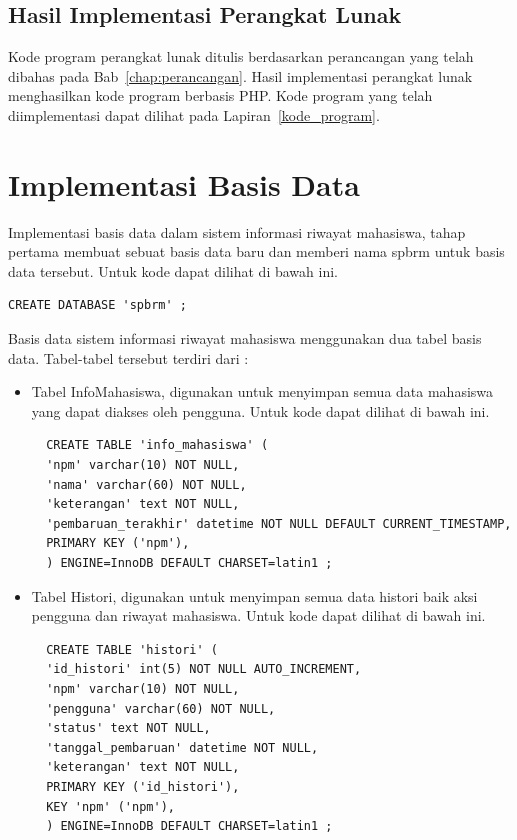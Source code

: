 \subsection{Hasil Implementasi Perangkat Lunak}
\label{sec:hasilimplementasi}

Kode program perangkat lunak ditulis berdasarkan perancangan yang telah dibahas pada Bab~\ref{chap:perancangan}. Hasil implementasi perangkat lunak menghasilkan kode program berbasis PHP. Kode program yang telah diimplementasi dapat dilihat pada Lapiran~\ref{kode_program}.

\section{Implementasi Basis Data}
\label{sec:implementasibasisdata}

Implementasi basis data dalam sistem informasi riwayat mahasiswa, tahap pertama membuat sebuat basis data baru dan memberi nama spbrm untuk basis data tersebut. Untuk kode dapat dilihat di bawah ini.
\begin{lstlisting}
CREATE DATABASE 'spbrm' ;
\end{lstlisting}

Basis data sistem informasi riwayat mahasiswa menggunakan dua tabel basis data. Tabel-tabel tersebut terdiri dari :
\begin{itemize}
\item Tabel InfoMahasiswa, digunakan untuk menyimpan semua data mahasiswa yang dapat diakses oleh pengguna. Untuk kode dapat dilihat di bawah ini.

\begin{lstlisting}
  CREATE TABLE 'info_mahasiswa' (
  'npm' varchar(10) NOT NULL,
  'nama' varchar(60) NOT NULL,
  'keterangan' text NOT NULL,
  'pembaruan_terakhir' datetime NOT NULL DEFAULT CURRENT_TIMESTAMP,
  PRIMARY KEY ('npm'),
  ) ENGINE=InnoDB DEFAULT CHARSET=latin1 ;
\end{lstlisting}

\item Tabel Histori, digunakan untuk menyimpan semua data histori baik aksi pengguna dan riwayat mahasiswa. Untuk kode dapat dilihat di bawah ini.
\begin{lstlisting}
  CREATE TABLE 'histori' (
  'id_histori' int(5) NOT NULL AUTO_INCREMENT,
  'npm' varchar(10) NOT NULL,
  'pengguna' varchar(60) NOT NULL,
  'status' text NOT NULL,
  'tanggal_pembaruan' datetime NOT NULL,
  'keterangan' text NOT NULL,
  PRIMARY KEY ('id_histori'),
  KEY 'npm' ('npm'),
  ) ENGINE=InnoDB DEFAULT CHARSET=latin1 ;
\end{lstlisting}
\end{itemize}

